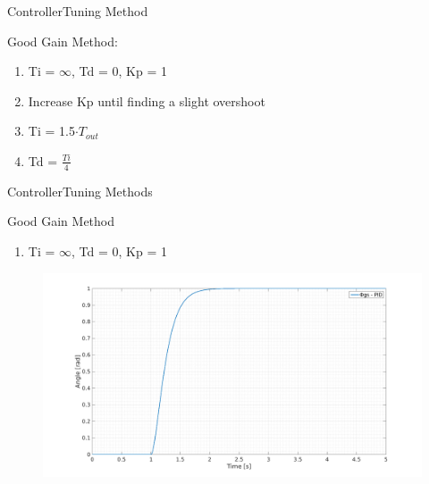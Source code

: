 \begin{frame}{Controller}{Tuning Method}
  \begin{block}{Good Gain Method:}
	  \begin{enumerate}
	  	\item Ti = $\infty$, Td = 0, Kp = 1
	  	\item Increase Kp until finding a slight overshoot
		\item Ti = 1.5$\cdot T_{out}$
		\item Td = $\frac{Ti}{4}$
	  \end{enumerate}
	  
  \end{block}
\end{frame}

\begin{frame}{Controller}{Tuning Methods}
  \begin{block}{Good Gain Method}
  
	  \begin{enumerate}
	  	\item Ti = $\infty$, Td = 0, Kp = 1
	  \end{enumerate}
	  \begin{figure}
       \includegraphics[scale=0.20]{../report/figures/GG1.png}
      \end{figure}
  
  \end{block}
\end{frame}

